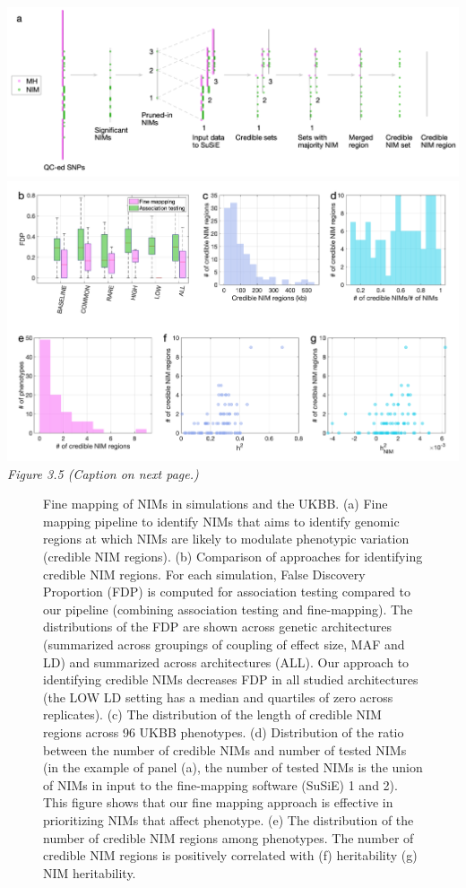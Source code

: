 \clearpage
\begin{center}
    \includegraphics[width=\textwidth]{chapter3/figures/fig3.5.png}
        \includegraphics[width=\textwidth]{chapter3/figures/fig3.5.1.png}
\emph{Figure 3.5 (Caption on next page.)}
\end{center}
\begin{figure}[!htb]
\caption{Fine mapping of NIMs in simulations and the UKBB. (a) Fine mapping pipeline to identify NIMs that aims to identify genomic regions at which NIMs are likely to modulate phenotypic variation (credible NIM regions). (b) Comparison of approaches for identifying credible NIM regions. For each simulation, False Discovery Proportion (FDP) is computed for association testing compared to our pipeline (combining association testing and fine-mapping). The distributions of the FDP are shown across genetic architectures (summarized across groupings of coupling of effect size, MAF and LD) and summarized across architectures (ALL). Our approach to identifying credible NIMs decreases FDP in all studied architectures (the LOW LD setting has a median and quartiles of zero across replicates). (c) The distribution of the length of credible NIM regions across 96 UKBB phenotypes. (d) Distribution of the ratio between the number of credible NIMs and number of tested NIMs (in the example of panel (a), the number of tested NIMs is the union of NIMs in input to the fine-mapping software (SuSiE) 1 and 2). This figure shows that our fine mapping approach is effective in prioritizing NIMs that affect phenotype. (e) The distribution of the number of credible NIM regions among phenotypes. The number of credible NIM regions is positively correlated with (f) heritability (g) NIM heritability.}
  \label{fig:3.5}
\end{figure}
